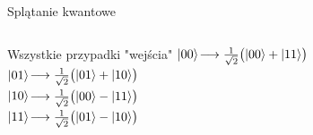 \documentclass{beamer}
\DeclarePairedDelimiter\ket{\lvert}{\rangle}
\begin{document}
\begin{frame}{Splątanie kwantowe}
\begin{columns}
			\begin{column}{0.5\textwidth}
				\begin{center}
				\begin{block}{Wszystkie przypadki "wejścia"}
					\vspace{0.5em}
					$\ket{00}$$\longrightarrow\frac{1}{\sqrt{2}}\big(\ket{00} + \ket{11} \big)$\\
					$\ket{01}$$\longrightarrow\frac{1}{\sqrt{2}}\big(\ket{01} + \ket{10} \big)$\\
					$\ket{10}$$\longrightarrow\frac{1}{\sqrt{2}}\big(\ket{00} - \ket{11} \big)$\\
					$\ket{11}$$\longrightarrow\frac{1}{\sqrt{2}}\big(\ket{01} - \ket{10} \big)$
					\vspace{0.5em}
				\end{block}
				\end{center}	
			\end{column}
		\end{columns}
	
	\end{frame}
	
\end{document}
